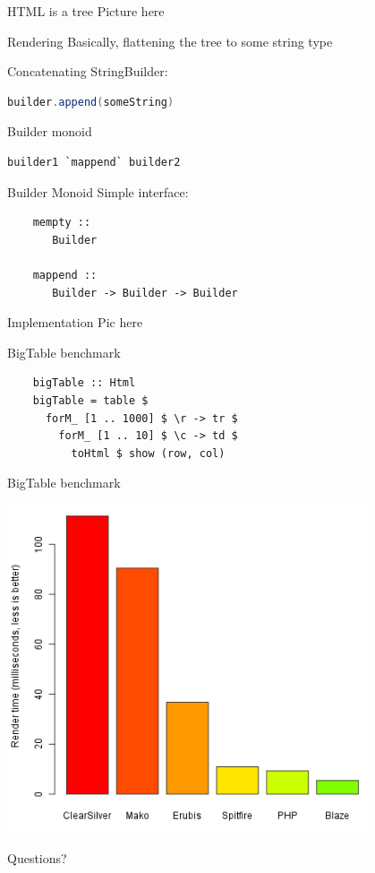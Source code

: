 \documentclass[20pt]{beamer}
\newcommand{\vspaced}{
    \vspace{5mm}
}
\begin{document}
\begin{frame}{HTML is a tree}
    Picture here
\end{frame}

\begin{frame}{Rendering}
    Basically, flattening the tree to some string type
\end{frame}

\begin{frame}[fragile]{Concatenating}
    StringBuilder:
    \begin{lstlisting}[language=Java]
    builder.append(someString)
    \end{lstlisting}
    \vspaced

    Builder monoid
    \begin{lstlisting}[language=Java]
    builder1 `mappend` builder2
    \end{lstlisting}
\end{frame}

\begin{frame}[fragile]{Builder Monoid}
    Simple interface:
    \vspaced
    \begin{lstlisting}
    mempty ::
       Builder

    mappend ::
       Builder -> Builder -> Builder
    \end{lstlisting}
\end{frame}

\begin{frame}[fragile]{Implementation}
    Pic here
\end{frame}

\begin{frame}[fragile, b]{BigTable benchmark}
    \begin{lstlisting}
    bigTable :: Html
    bigTable = table $
      forM_ [1 .. 1000] $ \r -> tr $
        forM_ [1 .. 10] $ \c -> td $
          toHtml $ show (row, col)
    \end{lstlisting}
    \vspaced
\end{frame}

\begin{frame}{BigTable benchmark}
    \begin{center}
    \includegraphics[width=0.8\textwidth]{images/benchmarks.png}
    \end{center}
\end{frame}

\begin{frame}{Questions?}

\end{frame}
\end{document}
